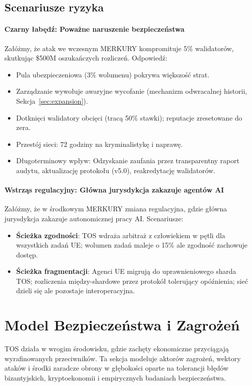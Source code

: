 \documentclass[11pt]{article}
\begin{document}
\subsection{Scenariusze ryzyka}
\paragraph{Czarny łabędź: Poważne naruszenie bezpieczeństwa}
Załóżmy, że atak we wczesnym MERKURY kompromituje 5\% walidatorów, skutkując \$500M oszukańczych rozliczeń. Odpowiedź:
\begin{itemize}[noitemsep]
  \item Pula ubezpieczeniowa (3\% wolumenu) pokrywa większość strat.
  \item Zarządzanie wywołuje awaryjne wycofanie (mechanizm odwracalnej historii, Sekcja~\ref{sec:expansion}).
  \item Dotknięci walidatory obcięci (tracą 50\% stawki); reputacje zresetowane do zera.
  \item Przestój sieci: 72 godziny na kryminalistykę i naprawę.
  \item Długoterminowy wpływ: Odzyskanie zaufania przez transparentny raport audytu, aktualizację protokołu (v5.0), reakredytację walidatorów.
\end{itemize}

\paragraph{Wstrząs regulacyjny: Główna jurysdykcja zakazuje agentów AI}
Załóżmy, że w środkowym MERKURY zmiana regulacyjna, gdzie główna jurysdykcja zakazuje autonomicznej pracy AI. Scenariusze:
\begin{itemize}[noitemsep]
  \item \textbf{Ścieżka zgodności}: TOS wdraża arbitraż z człowiekiem w pętli dla wszystkich zadań UE; wolumen zadań maleje o 15\% ale zgodność zachowuje dostęp.
  \item \textbf{Ścieżka fragmentacji}: Agenci UE migrują do uprawnieniowego sharda TOS; rozliczenia między-shardowe przez protokół tolerujący opóźnienia; sieć dzieli się ale pozostaje interoperacyjna.
\end{itemize}

\section{Model Bezpieczeństwa i Zagrożeń}
\label{sec:security}

TOS działa w wrogim środowisku, gdzie zachęty ekonomiczne przyciągają wyrafinowanych przeciwników. Ta sekcja modeluje aktorów zagrożeń, wektory ataków i środki zaradcze obrony w głębokości oparte na tolerancji błędów bizantyjskich, kryptoekonomii i empirycznych badaniach bezpieczeństwa.
\end{document}
